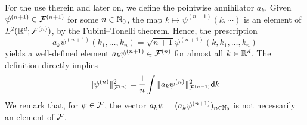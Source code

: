 \documentclass[a4paper,12pt,oneside]{article}
\begin{document}
For the use therein and later on, we define the pointwise annihilator $a_k$. Given $\psi^{(n+1)}\in{\mathcal F}^{(n+1)}$ for some $n\in{\mathbb N}_0$, the map $k\mapsto \psi^{(n+1)}(k,\cdots)$ is an element of $L^2({\mathbb R}^d;{\mathcal F}^{(n)})$, by the Fubini--Tonelli theorem. Hence, the prescription
\begin{equation}\label{eq:pointann}
	a_k \psi^{(n+1)} (k_1,\ldots,k_n)  = \sqrt{n+1}\psi^{(n+1)}(k,k_1,\ldots,k_n)
\end{equation}
yields a well-defined element $a_k\psi^{(n+1)}\in {\mathcal F}^{(n)}$ for almost all $k\in{\mathbb R}^d$.
The definition directly implies
\begin{equation}\label{eq:annnorm}
	\|\psi^{(n)}\|^2_{{\mathcal F}^{(n)}} = \frac{1}{n}\int \|a_k\psi^{(n)}\|^2_{{\mathcal F}^{(n-1)}}{\mathsf d} k
\end{equation}
 We remark that, for $\psi\in{\mathcal F}$, the vector $a_k\psi = (a_k\psi^{(n+1)})_{n\in{\mathbb N}_0}$ is not necessarily an element of ${\mathcal F}$.
\end{document}
